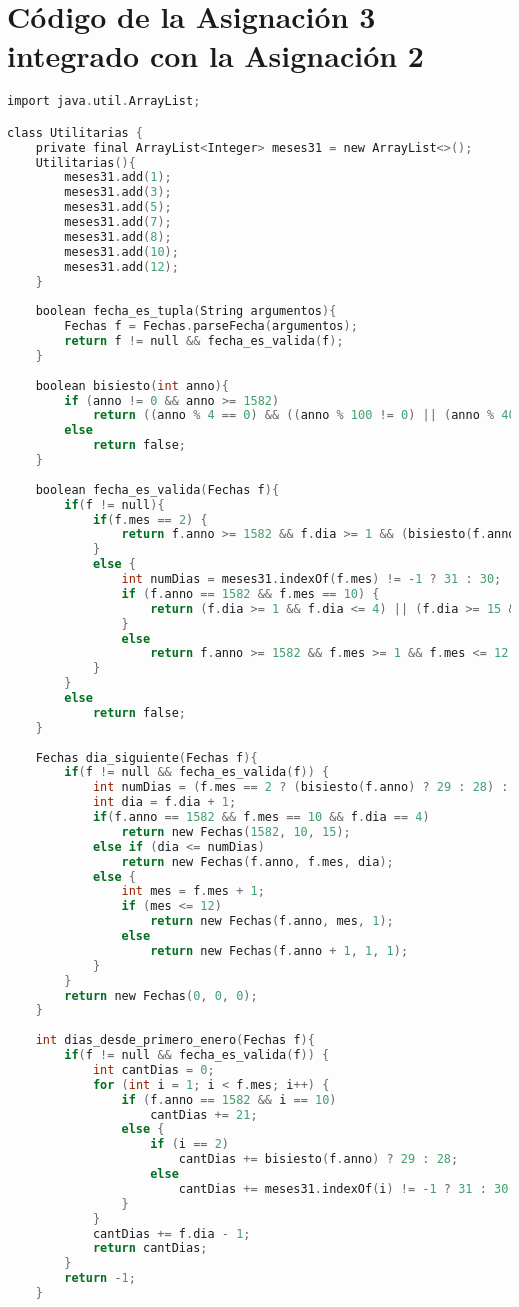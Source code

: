 \documentclass[10pt,journal,compsoc]{IEEEtran}
\begin{document}
\section{Código de la Asignación 3 integrado con la Asignación 2}
\begin{lstlisting}[language = C, caption = {Se omiten los comentarios en el código con el fin de ahorrar espacio}]
import java.util.ArrayList;

class Utilitarias {
	private final ArrayList<Integer> meses31 = new ArrayList<>();
	Utilitarias(){
		meses31.add(1);
		meses31.add(3);
		meses31.add(5);
		meses31.add(7);
		meses31.add(8);
		meses31.add(10);
		meses31.add(12);
	}
	
	boolean fecha_es_tupla(String argumentos){
		Fechas f = Fechas.parseFecha(argumentos);
		return f != null && fecha_es_valida(f);
	}
	
	boolean bisiesto(int anno){
		if (anno != 0 && anno >= 1582)
			return ((anno % 4 == 0) && ((anno % 100 != 0) || (anno % 400 == 0)));
		else
			return false;
	}
	
	boolean fecha_es_valida(Fechas f){
		if(f != null){
			if(f.mes == 2) {
				return f.anno >= 1582 && f.dia >= 1 && (bisiesto(f.anno) ? f.dia <= 29 : f.dia <= 28);
			}
			else {
				int numDias = meses31.indexOf(f.mes) != -1 ? 31 : 30;
				if (f.anno == 1582 && f.mes == 10) {
					return (f.dia >= 1 && f.dia <= 4) || (f.dia >= 15 && f.dia <= 31);
				}
				else
					return f.anno >= 1582 && f.mes >= 1 && f.mes <= 12 && f.dia >= 1 && f.dia <= numDias;
			}
		}
		else
			return false;
	}
	
	Fechas dia_siguiente(Fechas f){
		if(f != null && fecha_es_valida(f)) {
			int numDias = (f.mes == 2 ? (bisiesto(f.anno) ? 29 : 28) : (meses31.indexOf(f.mes) != -1 ? 31 : 30));
			int dia = f.dia + 1;
			if(f.anno == 1582 && f.mes == 10 && f.dia == 4)
				return new Fechas(1582, 10, 15);
			else if (dia <= numDias)
				return new Fechas(f.anno, f.mes, dia);
			else {
				int mes = f.mes + 1;
				if (mes <= 12)
					return new Fechas(f.anno, mes, 1);
				else
					return new Fechas(f.anno + 1, 1, 1);
			}
		}
		return new Fechas(0, 0, 0); 
	}
	
	int dias_desde_primero_enero(Fechas f){
		if(f != null && fecha_es_valida(f)) {
			int cantDias = 0; 
			for (int i = 1; i < f.mes; i++) {
				if (f.anno == 1582 && i == 10) 
					cantDias += 21;
				else {
					if (i == 2)
						cantDias += bisiesto(f.anno) ? 29 : 28;
					else
						cantDias += meses31.indexOf(i) != -1 ? 31 : 30;
				}
			}
			cantDias += f.dia - 1;
			return cantDias;
		}
		return -1;
	}
		

\end{lstlisting}
\end{document}
